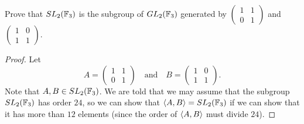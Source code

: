  Prove that $SL_2(\mathbb{F}_3)$ is the subgroup of $GL_2(\mathbb{F}_3)$
generated by $\begin{pmatrix} 1 & 1 \\ 0 & 1 \end{pmatrix}$ and
$\begin{pmatrix} 1 & 0 \\ 1 & 1 \end{pmatrix}$.
\begin{proof}
  Let
  \begin{equation*}
    A =
    \begin{pmatrix}
      1 & 1 \\
      0 & 1
    \end{pmatrix}
    \quad\text{and}\quad
    B =
    \begin{pmatrix}
      1 & 0 \\
      1 & 1
    \end{pmatrix}.
  \end{equation*}
  Note that $A,B\in SL_2(\mathbb{F}_3)$. We are told that we may assume that
  the subgroup $SL_2(\mathbb{F}_3)$ has order $24$, so we can show that
  $\langle{A,B}\rangle = SL_2(\mathbb{F}_3)$ if we can show that it has more than $12$
  elements (since the order of $\langle{A,B}\rangle$ must divide $24$).


\end{proof}
